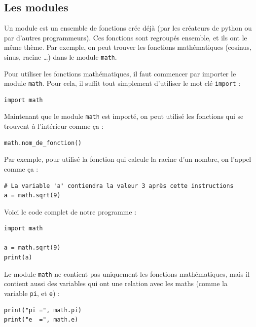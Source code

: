 \documentclass[12pt]{article}
\newcommand{\code}[1]{\colorbox{light-gray}{\texttt{#1}}}
\begin{document}
\clearpage

    \subsection{Les modules}
        Un module est un ensemble de fonctions crée déjà (par les créateurs de python ou par d'autres programmeurs).
        Ces fonctions sont regroupés ensemble,
        et ils ont le même thème. Par exemple, on peut trouver les fonctions mathématiques (cosinus, sinus,
        racine \ldots) dans le module \code{math}.

        Pour utiliser les fonctions mathématiques, il faut commencer par importer le module \code{math}. Pour cela,
        il suffit tout simplement d'utiliser le mot clé \code{import} :

        \begin{lstlisting}[style=code]
import math
        \end{lstlisting}

        Maintenant que le module \code{math} est importé, on peut utilisé les fonctions qui se trouvent à l'intérieur
        comme ça :
        \begin{lstlisting}[style=code]
math.nom_de_fonction()
        \end{lstlisting}

        Par exemple, pour utilisé la fonction qui calcule la racine d'un nombre, on l'appel comme ça :
        \begin{lstlisting}[style=code, breaklines=false]
# La variable 'a' contiendra la valeur 3 après cette instructions
a = math.sqrt(9)
        \end{lstlisting}

        Voici le code complet de notre programme :
        \begin{lstlisting}[style=code]
import math

a = math.sqrt(9)
print(a)
        \end{lstlisting}


        Le module \code{math} ne contient pas uniquement les fonctions mathématiques, mais il contient aussi
        des variables qui ont une relation avec les maths (comme la variable \code{pi}, et \code{e}) :

        \begin{lstlisting}[style=code]
print("pi =", math.pi)
print("e  =", math.e)
        \end{lstlisting}
\end{document}

